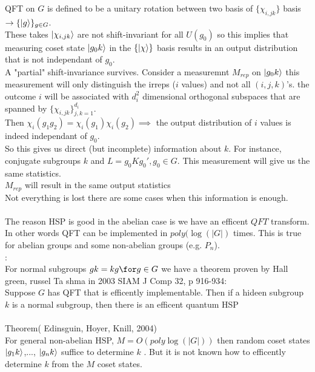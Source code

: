 \documentclass{article}
\begin{document}
QFT on $G$ is defined to be a unitary rotation between two basis of $\{ \chi_{i,jk} \}$ basis $\rightarrow \{ \ket{g} \}_{g \in G}$.\\
These takes $\ket{\chi_{i,jk}}$ are not shift-invariant for all $U(g_0)$ so this implies that measuring coset state $\ket{g_0 k}$ in the $\{ \ket{\chi}\}$ basis results in an output distribution that is not independant of $g_0$.\\
A "partial" shift-invariance survives. Consider a measuremnt $M_{rep}$ on $\ket{g_0 k}$ this measurement will only distinguish the irreps ($i$ values) and not all $(i,j,k)$'s. the outcome $i$ will be associated with $d_i^2$ dimensional orthogonal subspaces that are spanned by $\{\chi_{i,jk}\}_{j,k = 1}^{d_i}$.\\
Then $\chi_i(g_1 g_2) = \chi_i(g_1) \chi_i(g_2) \implies$ the output distribution of $i$ values is indeed independant of $g_0$.\\
So this gives us direct (but incomplete) information about $k$. For instance, conjugate subgroups $k$ and $L = g_0 K g_0', g_0 \in G$. This measurement will give us the same statistics.\\
$M_{rep}$ will result in the same output statistics\\
Not everything is lost there are some cases when this information is enough.\\\\
The reason HSP is good in the abelian case is we have an efficent $QFT$ transform. In other words QFT can be implemented in $poly(\log(|G|)$ times. This is true for abelian groups and some non-abelian groups (e.g. $P_n$).\\
:\\
For normal subgroups $gk = kg \for g \in G$ we have a theorem proven by Hall green, russel Ta shma in 2003 SIAM J Comp 32, p 916-934:\\
Suppose $G$ has QFT that is efficently implementable. Then if a hideen subgroup $k$ is a normal subgroup, then there is an efficent quantum HSP\\\\
Theorem( Edinsguin, Hoyer, Knill, 2004)\\
For general non-abelian HSP, $M = O(poly \log(|G|))$ then random coset states $\ket{g_1k}$,..., $\ket{g_nk}$ suffice to determine $k$ . But it is not known how to efficently determine $k$ from the $M$ coset states. 
\end{document}
